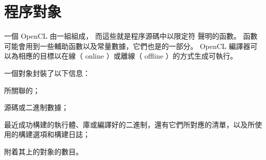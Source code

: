 \section{程序對象}

一個 OpenCL 由一組組成，
而這些就是程序源碼中以限定符  聲明的函數。
  函數可能會用到一些輔助函數以及常量數據，它們也是的一部分。
 OpenCL 編譯器可以為相應的目標以{\ftEmp 在線}（ {\ftEmp online} ）或{\ftEmp 離線}（ {\ftEmp offline} ）的方式生成可執行。

一個對象封裝了以下信息：
\startigBase
\item 所關聯的；
\item {}源碼或二進制數據；
\item 最近成功構建的執行體、庫或編譯好的二進制，還有它們所對應的清單，以及所使用的構建選項和構建日誌；
\item 附着其上的對象的數目。
\stopigBase

